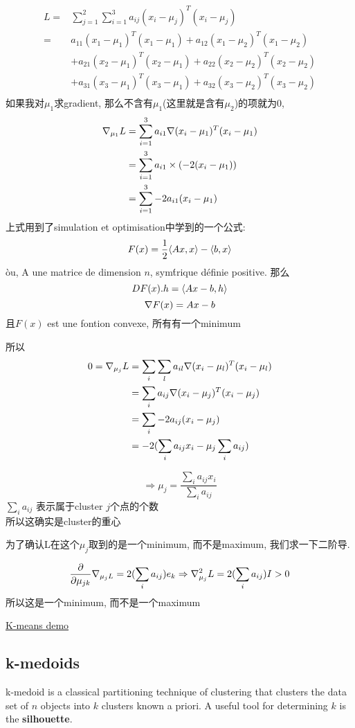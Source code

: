 \documentclass{article}
\begin{document}
$$
\begin{aligned}
L
= & \sum_{j = 1}^2 \sum_{i=1}^3 a_{ij}(x_i - \mu_j)^T (x_i - \mu_j) \\
= &  a_{11}(x_1 - \mu_1)^T (x_1 - \mu_1) + a_{12}(x_1 - \mu_2)^T (x_1 - \mu_2) \\
& + a_{21}(x_2 - \mu_1)^T (x_2 - \mu_1) + a_{22}(x_2 - \mu_2)^T (x_2 - \mu_2) \\
& + a_{31}(x_3 - \mu_1)^T (x_3 - \mu_1) + a_{32}(x_3 - \mu_2)^T (x_3 - \mu_2) \\
\end{aligned}
$$
如果我对$\mu_1$求gradient, 那么不含有$\mu_1$(这里就是含有$\mu_2$)的项就为0,
$$
\begin{aligned}
\nabla _{\mu_1}{L}
& = \sum_{i = 1}^3 a_{i1}\nabla (x_i - \mu_1)^T (x_i - \mu_1) \\
& = \sum_{i = 1}^3 a_{i1} \times (-2(x_i - \mu_1)) \\
& = \sum_{i = 1}^3  -2a_{i1}(x_i - \mu_1) \\
\end{aligned}
$$
上式用到了simulation et optimisation中学到的一个公式:
$$
F(x)= \frac{1}{2} \langle Ax , x\rangle - \langle b , x\rangle
$$
\`ou, A une matrice de dimension $n$, sym\'trique d\'efinie positive. 那么
$$DF(x).h = \langle Ax - b , h\rangle$$
$$\nabla F(x) = Ax - b$$
且$F(x)$ est une fontion convexe, 所有有一个minimum

所以
$$
\begin{aligned}
0 = \nabla _{\mu_j}{L}
&= \sum_i \sum_l a_{il} \nabla (x_i - \mu_l)^T (x_i - \mu_l) \\
&= \sum_i a_{ij} \nabla (x_i - \mu_j)^T (x_i - \mu_j) \\
&= \sum_i -2a_{ij} (x_i - \mu_j) \\
&= -2(\sum_i a_{ij}x_i - \mu_j \sum_i a_{ij})
\end{aligned}
$$

$$
\Rightarrow
\mu_j = \dfrac{\sum_i a_{ij}x_i}{\sum_i a_{ij}}
$$
$\sum_i a_{ij}$  表示属于cluster $j$个点的个数\\
所以这确实是cluster的重心

为了确认L在这个$\mu_j$取到的是一个minimum, 而不是maximum, 我们求一下二阶导.

$$
\frac{\partial }{\partial \mu_{jk}} \nabla _{\mu_{j} L}
= 2(\sum_i a_{ij}) e_k
\Rightarrow
\nabla ^2_{\mu_j} L = 2(\sum_i a_{ij})I > 0
$$
所以这是一个minimum, 而不是一个maximum

\href{https://www.youtube.com/watch?v=zHbxbb2ye3E}{K-means demo}

\subsection{k-medoids}
k-medoid is a classical partitioning technique of clustering that clusters the data set of $n$ objects into $k$ clusters known a priori. 
A useful tool for determining $k$ is the \textbf{silhouette}.
\end{document}
